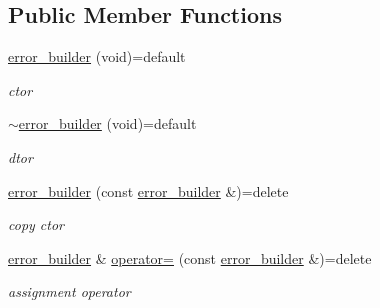 \subsection*{Public Member Functions}
\begin{DoxyCompactItemize}
\item 
\mbox{\label{classcpp__redis_1_1builders_1_1error__builder_abbc5e14b66702ec8b210fb1d288d2423}} 
\hyperlink{classcpp__redis_1_1builders_1_1error__builder_abbc5e14b66702ec8b210fb1d288d2423}{error\+\_\+builder} (void)=default
\begin{DoxyCompactList}\small\item\em ctor \end{DoxyCompactList}\item 
\mbox{\label{classcpp__redis_1_1builders_1_1error__builder_a7650c178a457c57c2efb19e7ad256fe7}} 
\hyperlink{classcpp__redis_1_1builders_1_1error__builder_a7650c178a457c57c2efb19e7ad256fe7}{$\sim$error\+\_\+builder} (void)=default
\begin{DoxyCompactList}\small\item\em dtor \end{DoxyCompactList}\item 
\mbox{\label{classcpp__redis_1_1builders_1_1error__builder_a2aee65fdc05abfacda73987e2cf60609}} 
\hyperlink{classcpp__redis_1_1builders_1_1error__builder_a2aee65fdc05abfacda73987e2cf60609}{error\+\_\+builder} (const \hyperlink{classcpp__redis_1_1builders_1_1error__builder}{error\+\_\+builder} \&)=delete
\begin{DoxyCompactList}\small\item\em copy ctor \end{DoxyCompactList}\item 
\mbox{\label{classcpp__redis_1_1builders_1_1error__builder_a0b1be51200ff84f17693ee888b03d505}} 
\hyperlink{classcpp__redis_1_1builders_1_1error__builder}{error\+\_\+builder} \& \hyperlink{classcpp__redis_1_1builders_1_1error__builder_a0b1be51200ff84f17693ee888b03d505}{operator=} (const \hyperlink{classcpp__redis_1_1builders_1_1error__builder}{error\+\_\+builder} \&)=delete
\begin{DoxyCompactList}\small\item\em assignment operator \end{DoxyCompactList}\item 

\end{DoxyCompactItemize}
